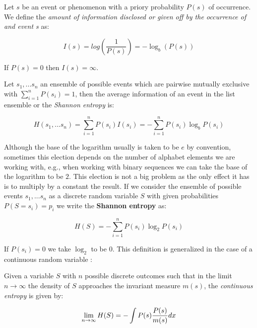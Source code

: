 \begin{defn}
Let $s$ be an event or phenomenon with a priory probability $P(s)$ of occurrence. We define the \textit{amount of information disclosed or given off by the occurrence of and event s} as:

\begin{equation}
  I(s)=log(\dfrac{1}{P(s)})=-\log_{b}(P(s))
\end{equation}

If $P(s)=0$ then $I(s)= \infty $.
\end{defn}

\begin{defn}
Let $s_{1},...s_{n}$ an ensemble of possible events which are pairwise mutually exclusive with $\sum_{i=1}^{n} P(s_{i}) = 1$, then the average information of an event in the list ensemble or the \textit{Shannon entropy} is:

\begin{equation}
  H(s_{1},...s_{n})=\sum_{i=1}^{n} P(s_{i}) I(s_{i}) = -\sum_{i=1}^{n} P(s_{i}) \log_{b} P(s_{i})
\end{equation}

\end{defn}

Although the base of the logarithm usually is taken to be $e$ by convention, sometimes this election depends on the number of alphabet elements we are working with, e.g., when working with binary sequences we can take the base of the logarithm to be $2$. This election is not a big problem as the only effect it has is to multiply by a constant the result. If we consider the ensemble of possible events $s_{1},...s_{n}$ as a discrete random variable $S$ with given probabilities $P(S=s_{i})=p_{i}$ we write the \textbf{Shannon entropy} as:

\begin{equation}
\label{entropy}
  H(S)= -\sum_{i=1}^{n} P(s_{i}) \log_{2} P(s_{i})
\end{equation}

If $P(s_{i})=0$ we take $\log_{2}$ to be $0$. This definition is generalized in the case of a continuous random variable \cite{kolmo_graph}:

\begin{defn}
Given a variable $S$ with $n$ possible discrete outcomes such that in the limit $n\to\infty$ the density of $S$ approaches the invariant measure $m(s)$, the \textit{continuous entropy} is given by:

\begin{equation}
  \lim_{n\to\infty} H(S)=- \int P(s) \frac{P(s)}{m(s)}dx \\
\end{equation}

\end{defn}

